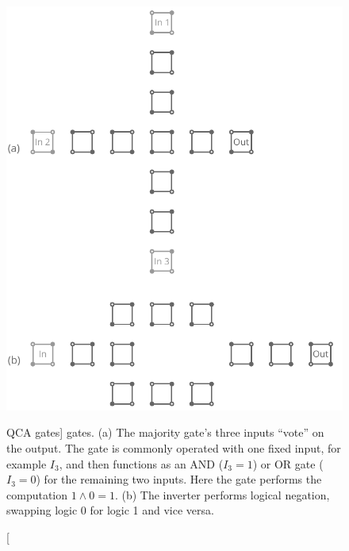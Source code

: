 \begin{figure}
  \center
  \includegraphics{gates}
  \caption
[QCA gates]
{
\label{fig:gates}
 gates. (a) The majority gate's three inputs ``vote'' on the output. The gate
is commonly operated with one fixed input, for example $I_3$, and then functions
as an AND ($I_3 = 1$) or OR gate ($I_3 = 0$) for the remaining two inputs. Here
the gate performs the computation $1 \land 0 = 1$. (b) The inverter performs
logical negation, swapping logic 0 for logic 1 and vice versa.
}
\end{figure}

